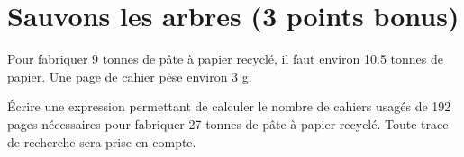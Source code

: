 \section{Sauvons les arbres (3 points bonus)}

Pour fabriquer 9 tonnes de pâte à papier recyclé, il faut environ \num{10.5} tonnes de papier. Une page de cahier pèse environ 3 g.

\begin{questions}
	\question[3] \'Ecrire une expression permettant de calculer le nombre de cahiers usagés de 192 pages nécessaires pour fabriquer 27 tonnes de pâte à papier recyclé. Toute trace de recherche sera prise en compte.
\end{questions}
